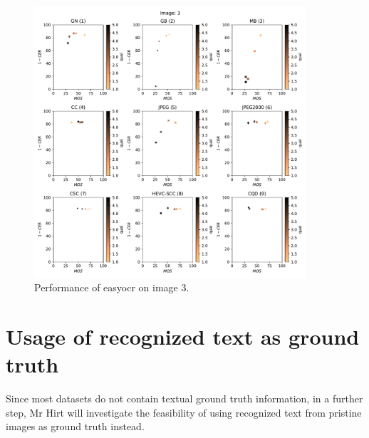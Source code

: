 \begin{figure}[h]
\centering
\includegraphics[width=0.9\textwidth]{../../images/analyze/mos_ter_ezocr_sub_img3.pdf}
\caption{Performance of easyocr on image 3.}
\label{fig:sub3}
\end{figure}

\section{Usage of recognized text as ground truth}

Since most datasets do not contain textual ground truth information,
in a further step, Mr Hirt will investigate the feasibility of
using recognized text from pristine images as ground truth instead.
